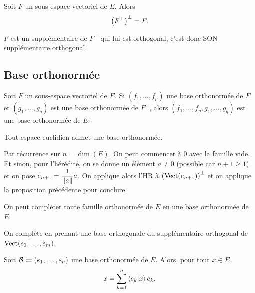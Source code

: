 \documentclass{magnolia}
\begin{document}
\begin{proposition}[utile=2]
Soit $F$ un sous-espace vectoriel de $E$. Alors
\[\left(F^\perp\right)^\perp=F.\]
\end{proposition}

\begin{preuve}
$F$ est un supplémentaire de $F^\perp$ qui lui est orthogonal, c'est donc SON supplémentaire orthogonal.
\end{preuve}



\subsection{Base orthonormée}

\begin{proposition}[utile=-3]
Soit $F$ un sous-espace vectoriel de $E$. Si $(f_1,\ldots,f_p)$ une base
orthonormée de $F$ et $(g_1,\ldots,g_q)$ est une base orthonormée de $F^\perp$,
alors $(f_1,\ldots,f_p,g_1,\ldots,g_q)$ est une base orthonormée de $E$.
\end{proposition}

\begin{proposition}[utile=-3]
Tout espace euclidien admet une base orthonormée.  
\end{proposition}

\begin{preuve}
Par récurrence sur $n=\dim(E)$. On peut commencer à $0$ avec la famille vide. Et sinon, pour l'hérédité, on se donne un élément $a\neq 0$ (possible car $n+1\geq 1$) et on pose $e_{n+1}=\dfrac{1}{\left\|a\right\|}a$. On applique alors l'HR à $\left(\operatorname{Vect}(e_{n+1})\right)^\perp$ et on applique la proposition précédente pour conclure.
\end{preuve}


\begin{proposition}[utile=-3,nom={Théorème de la base incomplète}]
On peut compléter toute famille orthonormée de $E$ en une base orthonormée de $E$.
\end{proposition}

\begin{preuve}
On complète en prenant une base orthogonale du supplémentaire orthogonal de $\operatorname{Vect}(e_1,\ldots,e_m)$.
\end{preuve}

\begin{proposition}[utile=-3]
Soit $\mathcal{B}\coloneqq\left(e_1,\ldots,e_n\right)$ une base orthonormée de $E$. Alors, pour
tout $x\in E$
\[x=\sum_{k=1}^n \left\langle {e_k}\middle|{x}\right\rangle e_k.\]
\end{proposition}
\end{document}
